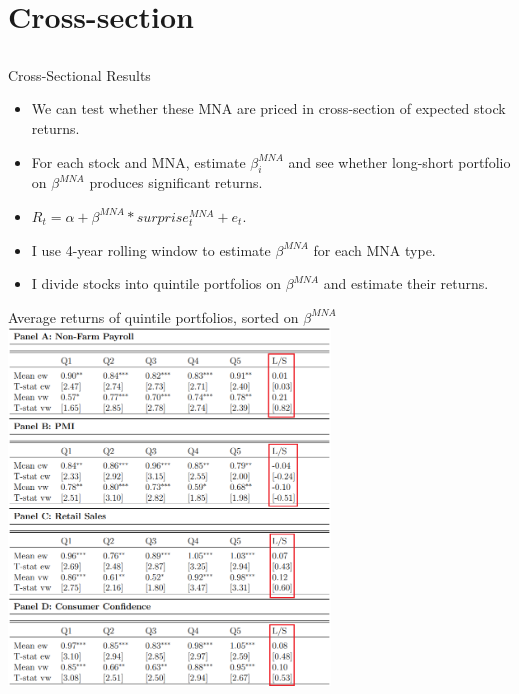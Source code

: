 \documentclass{beamer}
\begin{document}
\section{Cross-section}
\subsection{}

\begin{frame}{Cross-Sectional Results}
\begin{itemize}
    \item {We can test whether these MNA are priced in cross-section of expected stock returns.}
    \item {For each stock and MNA, estimate $\beta_i^{MNA}$ and see whether long-short portfolio on $\beta^{MNA}$ produces significant returns.}
    \item {$R_t = \alpha + \beta^{MNA}* surprise_t^{MNA}+e_t$.}
    \item {I use 4-year rolling window to estimate $\beta^{MNA}$ for each MNA type.}
    \item {I divide stocks into quintile portfolios on $\beta^{MNA}$ and estimate their returns.}
\end{itemize}
\end{frame}



\begin{frame}{Average returns of quintile portfolios, sorted on $\beta^{MNA}$}
\centering
\includegraphics[width=0.64\textwidth]{images/dp_t13.png}  
\end{frame}
\end{document}
